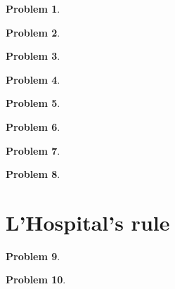 \documentclass{article}
\newtheorem{problem}{Problem}
\begin{document}
\begin{problem}

\end{problem}


\begin{problem}

\end{problem}


\begin{problem}

\end{problem}

\begin{problem}

\end{problem}
\begin{problem}

\end{problem}
\begin{problem}

\end{problem}
\begin{problem}

\end{problem}
\begin{problem}

\end{problem}
\section{L'Hospital's rule}

\begin{problem}

\end{problem}

\begin{problem}

\end{problem}

\end{document}
